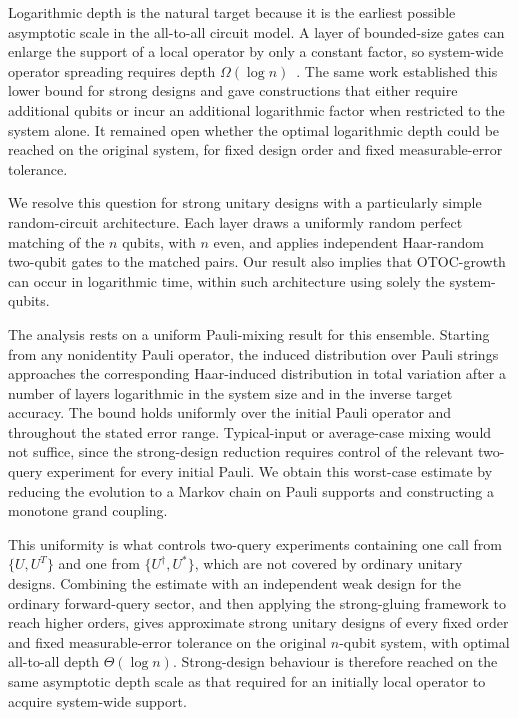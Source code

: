 \documentclass[
    aps,
    superscriptaddress,
    onecolumn,
    10pt,
    prx,
    nofootinbib
]{revtex4-2}
\theoremstyle{namedstatement}
\theoremstyle{plain}
\begin{document}
Logarithmic depth is the natural target because it is the earliest possible
asymptotic scale in the all-to-all circuit model. A layer of bounded-size gates
can enlarge the support of a local operator by only a constant factor, so
system-wide operator spreading requires depth
$\Omega(\log n)$~\cite{SchusterEtAlStrong2025}. The same work established this
lower bound for strong designs and gave constructions that either require
additional qubits or incur an additional logarithmic factor when restricted to
the system alone. It remained open whether the optimal logarithmic depth could
be reached on the original system, for fixed design order and fixed
measurable-error tolerance.

We resolve this question for strong unitary designs with a particularly simple
random-circuit architecture. Each layer draws a uniformly random perfect
matching of the $n$ qubits, with $n$ even, and applies independent Haar-random
two-qubit gates to the matched pairs. Our result also implies that OTOC-growth can occur in logarithmic time, within such architecture using solely the system-qubits.

The analysis rests on a uniform Pauli-mixing result for this ensemble. Starting
from any nonidentity Pauli operator, the induced distribution over Pauli strings
approaches the corresponding Haar-induced distribution in total variation after
a number of layers logarithmic in the system size and in the inverse target
accuracy. The bound holds uniformly over the initial Pauli operator and
throughout the stated error range. Typical-input or average-case mixing would not
suffice, since the strong-design reduction requires control of the relevant
two-query experiment for every initial Pauli. We obtain this worst-case estimate
by reducing the evolution to a Markov chain on Pauli supports and constructing a
monotone grand coupling.

This uniformity is what controls two-query experiments containing one call from
$\{U,U^T\}$ and one from $\{U^\dagger,U^*\}$, which are not covered by ordinary
unitary designs. Combining the estimate with an independent weak design for the
ordinary forward-query sector, and then applying the strong-gluing framework to
reach higher orders, gives approximate strong unitary designs of every fixed
order and fixed measurable-error tolerance on the original $n$-qubit system,
with optimal all-to-all depth $\Theta(\log n)$. Strong-design behaviour is
therefore reached on the same asymptotic depth scale as that required for an
initially local operator to acquire system-wide support.
\end{document}
